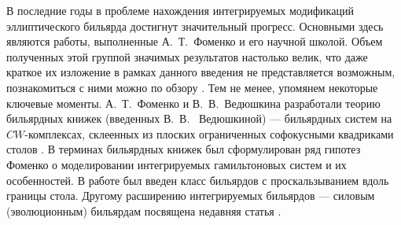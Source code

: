 В последние годы в проблеме нахождения интегрируемых модификаций эллиптического бильярда достигнут значительный прогресс. Основными здесь являются работы, выполненные А.~Т.~Фоменко и его научной школой.
Объем полученных этой группой значимых результатов настолько велик, что даже краткое их изложение в рамках данного введения не представляется возможным, познакомиться с ними можно по обзору \autocite{FomVed23}.
Тем не менее, упомянем некоторые ключевые моменты.
А.~Т.~Фоменко и В.~В.~Ведюшкина разработали теорию бильярдных книжек (введенных В.~В.~ Ведюшкиной) --- бильярдных систем на  $CW$-комплексах, склеенных из плоских ограниченных софокусными квадриками столов \autocite{VedFom19}.
В терминах бильярдных книжек был сформулирован ряд гипотез Фоменко о моделировании интегрируемых гамильтоновых систем и их особенностей.
В работе \autocite{zbMATH07344445}  был введен класс бильярдов с проскальзыванием вдоль границы стола. Другому расширению интегрируемых бильярдов --- силовым (эволюционным) бильярдам посвящена недавняя статья \autocite{FomVed22}.  
 

%

